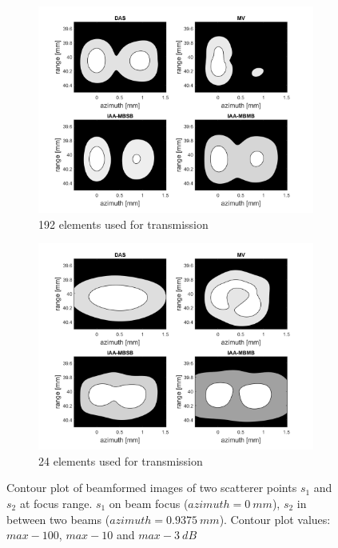 \begin{figure}[ht]
    \centering
    \begin{subfigure}[t]{0.48\linewidth}
        \includegraphics[width=\linewidth]{./images/discussion/all-doublesize.png}
        \caption{192 elements used for transmission}
    \end{subfigure}
    \quad
    \begin{subfigure}[t]{0.48\linewidth}
        \includegraphics[width=\linewidth]{./images/discussion/all-fourthsize.png}
        \caption{24 elements used for transmission}
    \end{subfigure}
\caption{Contour plot of beamformed images of two scatterer points $s_1$ and $s_2$ at focus range. $s_1$ on beam focus ($azimuth = 0~mm$), $s_2$ in between two beams ($azimuth = 0.9375~mm$). Contour plot values: $max-100$, $max-10$ and $max-3~dB$}
\label{fig:length_array_all}
\end{figure}

